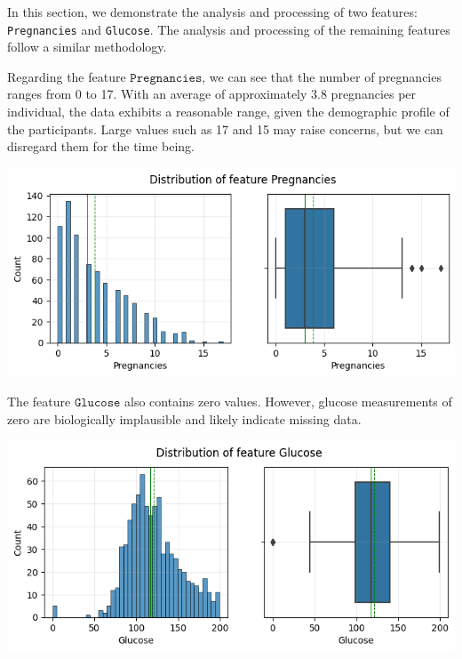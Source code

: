 \documentclass[12pt]{article}
\begin{document}
In this section, we demonstrate the analysis and processing of two features: \texttt{Pregnancies} and \texttt{Glucose}. The analysis and processing of the remaining features follow a similar methodology.


Regarding the feature $\mathtt{Pregnancies}$, we can see that the number of pregnancies ranges from 0 to 17. With an average of approximately 3.8 pregnancies per individual, the data exhibits a reasonable range, given the demographic profile of the participants. 
Large values such as 17 and 15 may raise concerns, but we can disregard them for the time being.



\begin{center}
    \includegraphics[width=0.7\linewidth]{images/dist - pregnancies.png}
    
    \vspace{-8pt}
    
    \label{fig:dist-pregnancies}
\end{center}

\vspace{-6pt}

The feature $\mathtt{Glucose}$ also contains zero values. However, glucose measurements of zero are biologically implausible and likely indicate missing data.

\vspace{-6pt}

\begin{center}
    \includegraphics[width=0.7\linewidth]{images/dist - glucose.png}
    
    \vspace{-8pt}
    
    \label{fig:dist-glucose}
\end{center}
\end{document}
